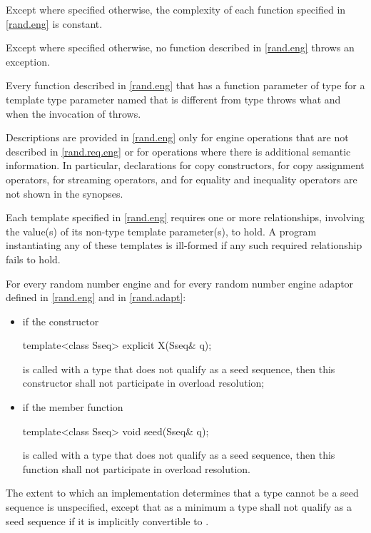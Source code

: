 \pnum
Except where specified otherwise,
the complexity of each function
specified in \ref{rand.eng}
is constant.

\pnum
Except where specified otherwise,
no function described in \ref{rand.eng}
throws an exception.

\pnum
Every function described in \ref{rand.eng}
that has a function parameter  of type 
for a template type parameter named 
that is different from type 
throws what and when the invocation of  throws.

\pnum
Descriptions are provided in \ref{rand.eng}
only for engine operations
that are not described in \ref{rand.req.eng}
or for operations where there is additional semantic information.
In particular,
declarations for copy constructors,
for copy assignment operators,
for streaming operators,
and for equality and inequality operators
are not shown in the synopses.

\pnum
Each template specified in \ref{rand.eng}
requires one or more relationships,
involving the value(s) of its non-type template parameter(s), to hold.
A program instantiating any of these templates
is ill-formed
if any such required relationship fails to hold.

\pnum
For every random number engine and for every random number engine adaptor 
defined in \ref{rand.eng} and in \ref{rand.adapt}:
\begin{itemize}
\item
if the constructor
\begin{codeblock}
template<class Sseq> explicit X(Sseq& q);
\end{codeblock}
is called with a type  that does not qualify as a seed sequence, then this
constructor shall not participate in overload resolution;

\item
if the member function
\begin{codeblock}
template<class Sseq> void seed(Sseq& q);
\end{codeblock}
is called with a type  that does not qualify as a seed sequence, then this
function shall not participate in overload resolution.
\end{itemize}

The extent to which an implementation determines that a type cannot be a seed sequence
is unspecified, except that as a minimum a type shall not qualify as a seed sequence
if it is implicitly convertible to .

